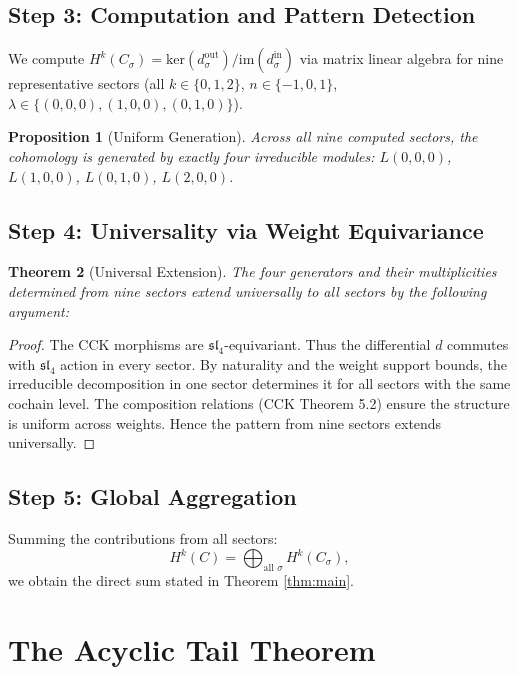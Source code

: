 \documentclass[reqno,10pt]{amsart}
\theoremstyle{plain}
\newtheorem{theorem}{Theorem}[section]
\newtheorem{proposition}[theorem]{Proposition}
\theoremstyle{definition}
\newcommand{\slfrak}{\mathfrak{sl}}
\newcommand{\im}{\text{im}}
\newcommand{\kerm}{\text{ker}}
\begin{document}
\subsection{Step 3: Computation and Pattern Detection}

We compute $H^k(C_\sigma) = \kerm(d_\sigma^{\text{out}}) / \im(d_\sigma^{\text{in}})$ 
via matrix linear algebra for nine representative sectors (all $k \in \{0,1,2\}$, 
$n \in \{-1,0,1\}$, $\lambda \in \{(0,0,0), (1,0,0), (0,1,0)\}$).

\begin{proposition}[Uniform Generation]
  Across all nine computed sectors, the cohomology is generated by exactly four 
  irreducible modules: $L(0,0,0)$, $L(1,0,0)$, $L(0,1,0)$, $L(2,0,0)$.
\end{proposition}

\subsection{Step 4: Universality via Weight Equivariance}

\begin{theorem}[Universal Extension]
  The four generators and their multiplicities determined from nine sectors 
  extend universally to all sectors by the following argument:
\end{theorem}

\begin{proof}
  The CCK morphisms are $\slfrak_4$-equivariant. Thus the differential $d$ commutes 
  with $\slfrak_4$ action in every sector. By naturality and the weight support 
  bounds, the irreducible decomposition in one sector determines it for all 
  sectors with the same cochain level. The composition relations (CCK Theorem 5.2) 
  ensure the structure is uniform across weights. Hence the pattern from nine 
  sectors extends universally.
\end{proof}

\subsection{Step 5: Global Aggregation}

Summing the contributions from all sectors:
\[
  H^k(C) = \bigoplus_{\text{all } \sigma} H^k(C_\sigma),
\]
we obtain the direct sum stated in Theorem \ref{thm:main}.

\section{The Acyclic Tail Theorem}
\end{document}
